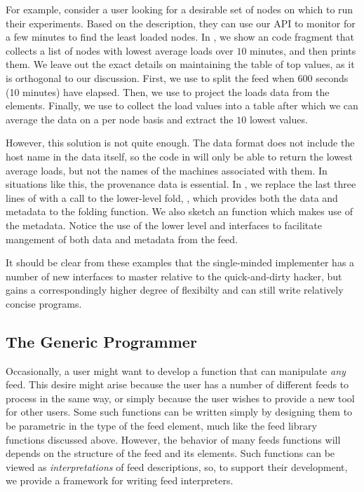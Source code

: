 For example, consider a \planetlab user looking for a desirable set of
nodes on which to run their experiments. Based on the \comon
description, they can use our API to monitor \planetlab for a few
minutes to find the least loaded nodes. In ,
we show an \ocaml code fragment that collects a list of nodes with
lowest average loads over $10$ minutes, and then prints them. We leave
out the exact details on maintaining the table of top values, as it is
orthogonal to our discussion. First, we use  to
split the feed when 600 seconds (10 minutes) have elapsed. Then, we
use  to project the loads data from the\comon
elements. Finally, we use  to collect the load values
into a table after which we can average the data on a per node basis
and extract the $10$ lowest values.

However, this solution is not quite enough. The \comon data format
does not include the host name in the data itself, so the code in
 will only be able to return the lowest
average loads, but not the names of the machines associated with
them. In situations like this, the provenance data is essential.  In
, we replace the last three lines of
 with a call to the lower-level fold,
, which provides both the data and metadata to the folding
function. We also sketch an  function which makes use of 
the metadata.   Notice the use of the lower level  and
 interfaces to facilitate mangement of both data and 
metadata from the feed. 

It should be clear from these examples that the single-minded implementer
has a number of new interfaces to master relative to the quick-and-dirty
hacker, but gains a correspondingly higher degree of flexibilty and can
still write relatively concise programs.

\subsection{The Generic Programmer}


Occasionally, a user might want to develop a function that can
manipulate {\it any} feed. This desire might arise because the user
has a number of different feeds to process in the same way, or simply
because the user wishes to provide a new tool for other \padsd{}
users. Some such functions can be written simply by designing them to
be parametric in the type of the feed element, much like the feed
library functions discussed above. However, the behavior of many feeds
functions will depends on the structure of the feed and its
elements. Such functions can be viewed as {\it interpretations} of
feed descriptions, so, to support their development, we provide a
framework for writing feed interpreters.

